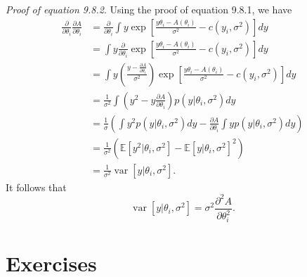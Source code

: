 \documentclass[a4paper,11pt]{article}
\DeclareMathOperator*{\var}{var}
\newcounter{exercise}
\begin{document}
\textit{Proof of equation 9.8.2}.
Using the proof of equation 9.8.1, we have
\begin{align*}
    \frac{\partial}{\partial \theta_i}\frac{\partial A}{\partial \theta_i}
    &= \frac{\partial}{\partial \theta_i}
    \int y \exp\left[
        \frac{ y\theta_i - A(\theta_i) }{ \sigma^2 } - c(y_i, \sigma^2)
    \right]dy \\
    &= \int y \frac{\partial}{\partial \theta_i} \exp\left[
        \frac{ y\theta_i - A(\theta_i) }{ \sigma^2 } - c(y_i, \sigma^2)
    \right]dy \\
    &= \int y\left(\frac{
        y-\frac{\partial A}{\partial \theta_i}
    }{
        \sigma^2
    }\right)\exp\left[
        \frac{ y\theta_i - A(\theta_i) }{ \sigma^2 } - c(y_i, \sigma^2)
    \right]dy \\
    &= \frac{1}{\sigma^2} \int
    \left(
        y^2 - y\frac{\partial A}{\partial \theta_i}
    \right)p(y|\theta_i, \sigma^2)dy \\
    &= \frac{1}{\sigma}\left(
        \int y^2p(y|\theta_i, \sigma^2)dy
        - \frac{\partial A}{\partial \theta_i}
        \int y p(y|\theta_i, \sigma^2)dy
    \right) \\
    &= \frac{1}{\sigma^2}\left(
        \mathbb{E}[y^2|\theta_i, \sigma^2]-\mathbb{E}[y|\theta_i, \sigma^2]^2
    \right) \\
    &= \frac{1}{\sigma^2}\var[y|\theta_i, \sigma^2].
\end{align*}
It follows that
\[
    \var[y|\theta_i, \sigma^2]
    = \sigma^2\frac{\partial^2A}{\partial\theta_i^2}.
\]
\section*{Exercises}

\setcounter{exercise}{1}
\end{document}
